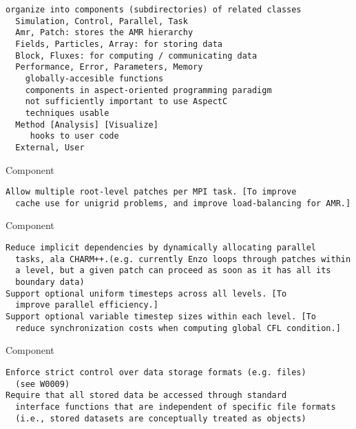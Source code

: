 \documentclass[14pt,letter]{article}
\begin{document}
\begin{verbatim}
organize into components (subdirectories) of related classes
  Simulation, Control, Parallel, Task
  Amr, Patch: stores the AMR hierarchy
  Fields, Particles, Array: for storing data
  Block, Fluxes: for computing / communicating data
  Performance, Error, Parameters, Memory
    globally-accesible functions
    components in aspect-oriented programming paradigm
    not sufficiently important to use AspectC
    techniques usable
  Method [Analysis] [Visualize]
     hooks to user code
  External, User
\end{verbatim}


 Component

\begin{verbatim}
Allow multiple root-level patches per MPI task. [To improve
  cache use for unigrid problems, and improve load-balancing for AMR.]
\end{verbatim}

 Component

\begin{verbatim}
Reduce implicit dependencies by dynamically allocating parallel
  tasks, ala CHARM++.(e.g. currently Enzo loops through patches within
  a level, but a given patch can proceed as soon as it has all its
  boundary data)
Support optional uniform timesteps across all levels. [To
  improve parallel efficiency.]
Support optional variable timestep sizes within each level. [To
  reduce synchronization costs when computing global CFL condition.]
\end{verbatim}

 Component

\begin{verbatim}
Enforce strict control over data storage formats (e.g. files)
  (see W0009)
Require that all stored data be accessed through standard
  interface functions that are independent of specific file formats
  (i.e., stored datasets are conceptually treated as objects)
\end{verbatim}
\end{document}
